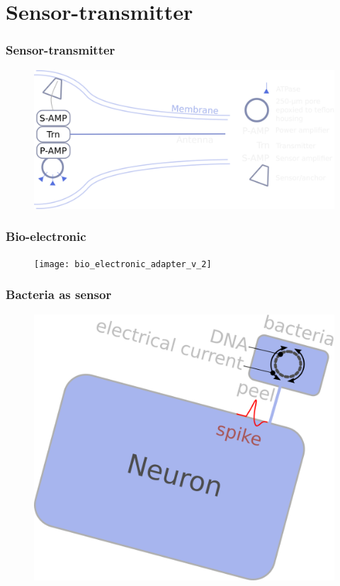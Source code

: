 \documentclass[12pt]{beamer}
\begin{document}
\section{Sensor-transmitter}

\begin{frame}
\frametitle{Sensor-transmitter}
\begin{figure}
\includegraphics[width=1.0\linewidth]{cellCircuit_transmitter}
\end{figure}
\end{frame}


\begin{frame}
\frametitle{Bio-electronic}
\begin{figure}
\texttt{[image: bio\_electronic\_adapter\_v\_2]}
\end{figure}
\end{frame}


\begin{frame}
\frametitle{Bacteria as sensor}
\begin{figure}
\includegraphics[width=0.9\linewidth]{bacteria_sensing}
\end{figure}
\end{frame}
\end{document}
